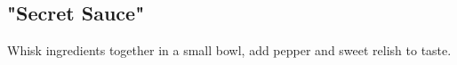 \begin{recipe}
\subsection{"Secret Sauce"}



Whisk ingredients together in a small bowl, add pepper and sweet relish to taste.

\end{recipe}
